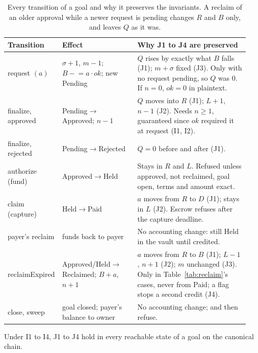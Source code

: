 \begin{table}[t]
\centering\small
\begin{tabular}{@{}L{0.17\linewidth}L{0.31\linewidth}L{0.46\linewidth}@{}}
\toprule
Transition & Effect & Why J1 to J4 are preserved \\
\midrule
request $(a)$ & $\sigma{+}1$, $m{-}1$; $B \mathrel{-}= a\cdot\mathit{ok}$; new \textsf{Pending} & $Q$ rises by exactly what $B$ falls (J1); $m + \sigma$ fixed (J3). Only with no request pending, so $Q$ was 0. If $n = 0$, $\mathit{ok} = 0$ in plaintext. \\
finalize, approved & \textsf{Pending}$\to$\textsf{Approved}; $n{-}1$ & $Q$ moves into $R$ (J1); $L{+}1$, $n{-}1$ (J2). Needs $n \ge 1$, guaranteed since $\mathit{ok}$ required it at request (I1, I2). \\
finalize, rejected & \textsf{Pending}$\to$\textsf{Rejected} & $Q = 0$ before and after (J1). \\
authorize (fund) & \textsf{Approved}$\to$\textsf{Held} & Stays in $R$ and $L$. Refused unless approved, not reclaimed, goal open, terms and amount exact. \\
claim (capture) & \textsf{Held}$\to$\textsf{Paid} & $a$ moves from $R$ to $D$ (J1); stays in $L$ (J2). Escrow refuses after the capture deadline. \\
payer's reclaim & funds back to payer & No accounting change: still \textsf{Held} in the vault until credited. \\
reclaimExpired & \textsf{Approved}/\textsf{Held}$\to$\textsf{Reclaimed}; $B{+}a$, $n{+}1$ & $a$ moves from $R$ to $B$ (J1); $L{-}1$, $n{+}1$ (J2); $m$ unchanged (J3). Only in Table~\ref{tab:reclaim}'s cases, never from \textsf{Paid}; a flag stops a second credit (J4). \\
close, sweep & goal closed; payer's balance to owner & No accounting change;  and  then refuse. \\
\bottomrule
\end{tabular}
\caption{Every transition of a goal and why it preserves the invariants. A reclaim of an older approval while a newer request is
pending changes $R$ and $B$ only, and leaves $Q$ as it was.}
\label{tab:transitions}
\end{table}

\begin{proposition}[Invariants]\label{prop:inv}
Under I1 to I4, J1 to J4 hold in every reachable state of a goal on the canonical chain.
\end{proposition}

